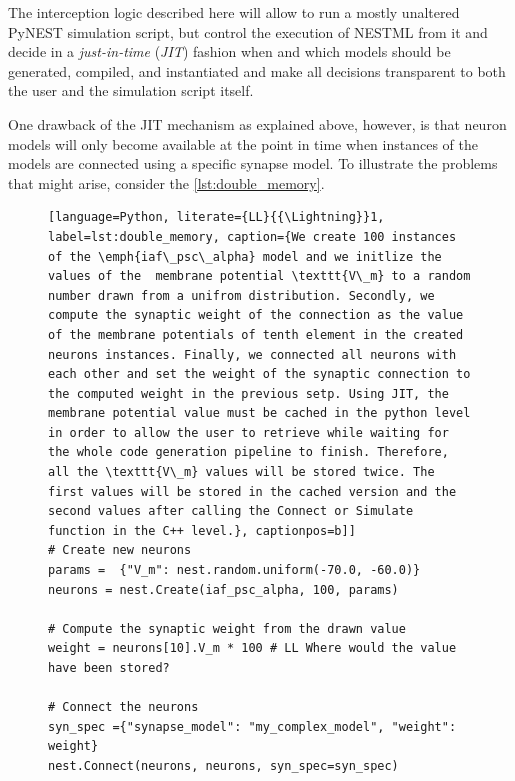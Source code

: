The interception logic described here will allow to run a mostly unaltered PyNEST simulation script, but control the execution of NESTML from it and decide in a \emph{just-in-time} (\emph{JIT}) fashion when and which models should be generated, compiled, and instantiated and make all decisions transparent to both the user and the simulation script itself.

One drawback of the JIT mechanism as explained above, however, is that neuron models will only become available at the point in time when instances of the models are connected using a specific synapse model. To illustrate the problems that might arise, consider the \autoref{lst:double_memory}.

\begin{figure}[ht!]
  \centering
\begin{lstlisting}[language=Python, literate={LL}{{\Lightning}}1, label=lst:double_memory, caption={We create 100 instances of the \emph{iaf\_psc\_alpha} model and we initlize the values of the  membrane potential \texttt{V\_m} to a random number drawn from a unifrom distribution. Secondly, we compute the synaptic weight of the connection as the value of the membrane potentials of tenth element in the created neurons instances. Finally, we connected all neurons with each other and set the weight of the synaptic connection to the computed weight in the previous setp. Using JIT, the membrane potential value must be cached in the python level in order to allow the user to retrieve while waiting for the whole code generation pipeline to finish. Therefore, all the \texttt{V\_m} values will be stored twice. The first values will be stored in the cached version and the second values after calling the Connect or Simulate function in the C++ level.}, captionpos=b]]
# Create new neurons
params =  {"V_m": nest.random.uniform(-70.0, -60.0)}
neurons = nest.Create(iaf_psc_alpha, 100, params)

# Compute the synaptic weight from the drawn value
weight = neurons[10].V_m * 100 # LL Where would the value have been stored?

# Connect the neurons
syn_spec ={"synapse_model": "my_complex_model", "weight": weight}
nest.Connect(neurons, neurons, syn_spec=syn_spec)
\end{lstlisting}
\end{figure}


